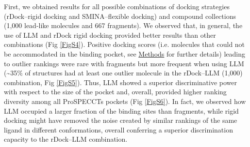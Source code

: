 First, we obtained results for all possible combinations of docking strategies (rDock--rigid docking and SMINA--flexible docking) and compound collections (1,000 lead-like molecules and 667 fragments). We observed that, in general, the use of LLM and rDock rigid docking provided better results than other combinations (Fig \ref{FigS4}). Positive docking scores (i.e. molecules that could not be accommodated in the binding pocket, see \hyperref[PocketVec_Methods]{Methods} for further details) leading to outlier rankings were rare with fragments but more frequent when using LLM (\textasciitilde35\% of structures had at least one outlier molecule in the rDock--LLM (1,000) combination, Fig \ref{FigS5}). Thus, LLM showed a superior discriminative power with respect to the size of the pocket and, overall, provided higher ranking diversity among all ProSPECCTs pockets (Fig \ref{FigS6}). In fact, we observed how LLM occupied a larger fraction of the binding sites than fragments, while rigid docking might have removed the noise created by similar rankings of the same ligand in different conformations, overall conferring a superior discrimination capacity to the rDock--LLM combination.